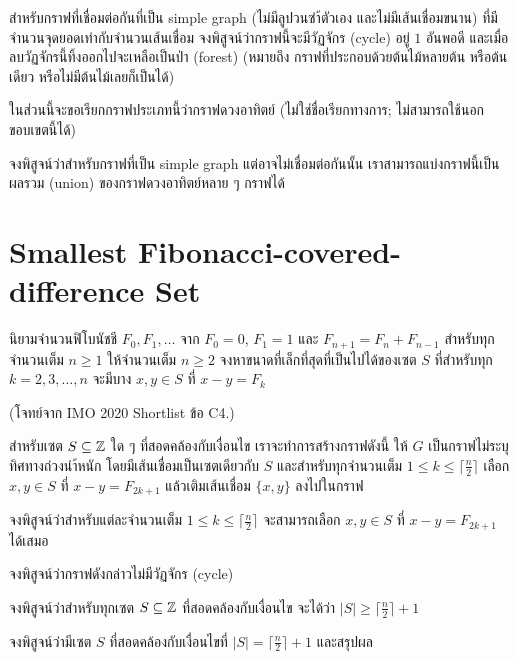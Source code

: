 \begin{exercise}
สำหรับกราฟที่เชื่อมต่อกันที่เป็น simple graph (ไม่มีลูปวนซำ้ตัวเอง และไม่มีเส้นเชื่อมขนาน) ที่มีจำนวนจุดยอดเท่ากับจำนวนเส้นเชื่อม จงพิสูจน์ว่ากราฟนี้จะมีวัฏจักร (cycle) อยู่ $1$ อันพอดี และเมื่อลบวัฏจักรนี้ทิ้งออกไปจะเหลือเป็นป่า (forest) (หมายถึง กราฟที่ประกอบด้วยต้นไม้หลายต้น หรือต้นเดียว หรือไม่มีต้นไม้เลยก็เป็นได้)

ในส่วนนี้จะขอเรียกกราฟประเภทนี้ว่ากราฟดวงอาทิตย์ (ไม่ใช่ชื่อเรียกทางการ; ไม่สามารถใช้นอกขอบเขตนี้ได้)
\end{exercise}

\begin{exercise}
จงพิสูจน์ว่าสำหรับกราฟที่เป็น simple graph แต่อาจไม่เชื่อมต่อกันนั้น เราสามารถแบ่งกราฟนี้เป็นผลรวม (union) ของกราฟดวงอาทิตย์หลาย ๆ กราฟได้
\end{exercise}

\section{Smallest Fibonacci-covered-difference Set}
\label{imo:2020slc4}

นิยามจำนวนฟิโบนัชชี $F_0, F_1, \dots$ จาก $F_0 = 0$, $F_1 = 1$ และ $F_{n+1} = F_{n} + F_{n-1}$ สำหรับทุกจำนวนเต็ม $n \geq 1$ ให้จำนวนเต็ม $n \geq 2$ จงหาขนาดที่เล็กที่สุดที่เป็นไปได้ของเซต $S$ ที่สำหรับทุก $k = 2, 3, \dots, n$ จะมีบาง $x, y \in S$ ที่ $x - y = F_k$

(โจทย์จาก IMO 2020 Shortlist ข้อ C4.)

สำหรับเซต $S \subseteq \mathbb{Z}$ ใด ๆ ที่สอดคล้องกับเงื่อนไข เราจะทำการสร้างกราฟดังนี้ ให้ $G$ เป็นกราฟไม่ระบุทิศทางถ่วงนำ้หนัก โดยมีเส้นเชื่อมเป็นเซตเดียวกับ $S$ และสำหรับทุกจำนวนเต็ม $1 \leq k \leq \lceil \frac{n}{2} \rceil$ เลือก $x, y \in S$  ที่ $x - y = F_{2k+1}$ แล้วเติมเส้นเชื่อม $\{x, y\}$ ลงไปในกราฟ

\begin{exercise}
จงพิสูจน์ว่าสำหรับแต่ละจำนวนเต็ม $1 \leq k \leq \lceil \frac{n}{2} \rceil$ จะสามารถเลือก $x, y \in S$ ที่ $x - y = F_{2k+1}$ ได้เสมอ
\end{exercise}

\begin{exercise}
จงพิสูจน์ว่ากราฟดังกล่าวไม่มีวัฏจักร (cycle)
\end{exercise}

\begin{exercise}
จงพิสูจน์ว่าสำหรับทุกเซต $S \subseteq \mathbb{Z}$ ที่สอดคล้องกับเงื่อนไข จะได้ว่า $|S| \geq \lceil \frac{n}{2} \rceil + 1$
\end{exercise}

\begin{exercise}
จงพิสูจน์ว่ามีเซต $S$ ที่สอดคล้องกับเงื่อนไขที่ $|S| = \lceil \frac{n}{2} \rceil + 1$ และสรุปผล
\end{exercise}